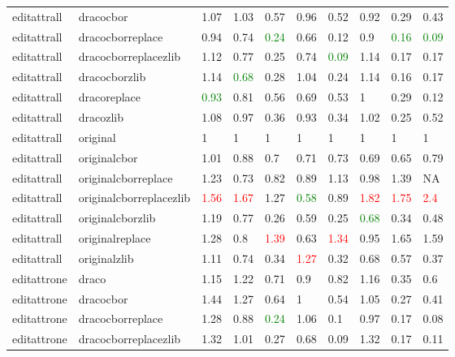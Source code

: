 \begin{landscape}
\begin{longtable}{llllllllll}
\rowcolor{lightgray}  editattrall & dracocbor & 1.07 & 1.03 & 0.57 & 0.96 & 0.52 & 0.92 & 0.29 & 0.43\\
\rowcolor{lightgray}  editattrall & dracocborreplace & 0.94 & 0.74 & \textcolor{green}{0.24} & 0.66 & 0.12 & 0.9 & \textcolor{green}{0.16} & \textcolor{green}{0.09}\\
\rowcolor{lightgray}  editattrall & dracocborreplacezlib & 1.12 & 0.77 & 0.25 & 0.74 & \textcolor{green}{0.09} & 1.14 & 0.17 & 0.17\\
\rowcolor{lightgray}  editattrall & dracocborzlib & 1.14 & \textcolor{green}{0.68} & 0.28 & 1.04 & 0.24 & 1.14 & 0.16 & 0.17\\
\rowcolor{lightgray}  editattrall & dracoreplace & \textcolor{green}{0.93} & 0.81 & 0.56 & 0.69 & 0.53 & 1 & 0.29 & 0.12\\
\rowcolor{lightgray}  editattrall & dracozlib & 1.08 & 0.97 & 0.36 & 0.93 & 0.34 & 1.02 & 0.25 & 0.52\\
\rowcolor{lightgray}  editattrall & original & 1 & 1 & 1 & 1 & 1 & 1 & 1 & 1\\
\rowcolor{lightgray}  editattrall & originalcbor & 1.01 & 0.88 & 0.7 & 0.71 & 0.73 & 0.69 & 0.65 & 0.79\\
\rowcolor{lightgray}  editattrall & originalcborreplace & 1.23 & 0.73 & 0.82 & 0.89 & 1.13 & 0.98 & 1.39 & NA\\
\rowcolor{lightgray}  editattrall & originalcborreplacezlib & \textcolor{red}{1.56} & \textcolor{red}{1.67} & 1.27 & \textcolor{green}{0.58} & 0.89 & \textcolor{red}{1.82} & \textcolor{red}{1.75} & \textcolor{red}{2.4}\\
editattrall & originalcborzlib & 1.19 & 0.77 & 0.26 & 0.59 & 0.25 & \textcolor{green}{0.68} & 0.34 & 0.48\\
editattrall & originalreplace & 1.28 & 0.8 & \textcolor{red}{1.39} & 0.63 & \textcolor{red}{1.34} & 0.95 & 1.65 & 1.59\\
editattrall & originalzlib & 1.11 & 0.74 & 0.34 & \textcolor{red}{1.27} & 0.32 & 0.68 & 0.57 & 0.37\\
editattrone & draco & 1.15 & 1.22 & 0.71 & 0.9 & 0.82 & 1.16 & 0.35 & 0.6\\
editattrone & dracocbor & 1.44 & 1.27 & 0.64 & 1 & 0.54 & 1.05 & 0.27 & 0.41\\
editattrone & dracocborreplace & 1.28 & 0.88 & \textcolor{green}{0.24} & 1.06 & 0.1 & 0.97 & 0.17 & 0.08\\
editattrone & dracocborreplacezlib & 1.32 & 1.01 & 0.27 & 0.68 & 0.09 & 1.32 & 0.17 & 0.11\\

\end{longtable}
\end{landscape}
